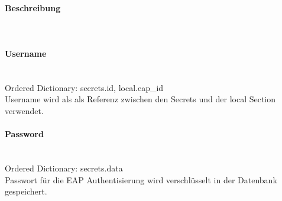 \begin{minipage}[t]{0.5\textwidth}
\vspace{0pt}
\paragraph{Beschreibung}\mbox{}\\
\paragraph{Username}\mbox{}\\
\hspace*{18pt}Ordered Dictionary: secrets.id, local.eap\_id\\
Username wird als als Referenz zwischen den Secrets und der local Section verwendet. \\

\paragraph{Password}\mbox{}\\
\hspace*{18pt}Ordered Dictionary: secrets.data\\
Passwort für die EAP Authentisierung wird verschlüsselt in der Datenbank gespeichert.\\

\end{minipage}
\newpage


